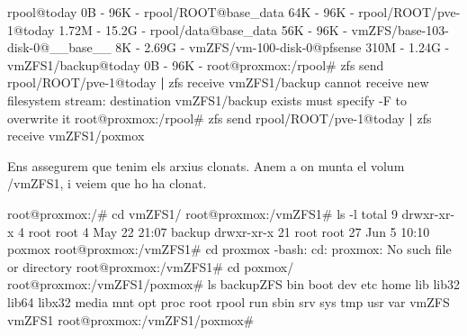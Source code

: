 \documentclass[
  10pt,
]{krantz}
\newenvironment{Shaded}{\begin{snugshade}}{\end{snugshade}}
\newcommand{\AttributeTok}[1]{\textcolor[rgb]{0.77,0.63,0.00}{#1}}
\newcommand{\ExtensionTok}[1]{#1}
\newcommand{\KeywordTok}[1]{\textcolor[rgb]{0.13,0.29,0.53}{\textbf{#1}}}
\newcommand{\NormalTok}[1]{#1}
\newcommand{\StringTok}[1]{\textcolor[rgb]{0.31,0.60,0.02}{#1}}
\begin{document}
\begin{Shaded}
\begin{Highlighting}[]
\ExtensionTok{rpool@today}\NormalTok{                        0B      }\AttributeTok{{-}}\NormalTok{       96K  }\AttributeTok{{-}}
\ExtensionTok{rpool/ROOT@base\_data}\NormalTok{              64K      }\AttributeTok{{-}}\NormalTok{       96K  }\AttributeTok{{-}}
\ExtensionTok{rpool/ROOT/pve{-}1@today}\NormalTok{          1.72M      }\AttributeTok{{-}}\NormalTok{     15.2G  }\AttributeTok{{-}}
\ExtensionTok{rpool/data@base\_data}\NormalTok{              56K      }\AttributeTok{{-}}\NormalTok{       96K  }\AttributeTok{{-}}
\ExtensionTok{vmZFS/base{-}103{-}disk{-}0@\_\_base\_\_}\NormalTok{     8K      }\AttributeTok{{-}}\NormalTok{     2.69G  }\AttributeTok{{-}}
\ExtensionTok{vmZFS/vm{-}100{-}disk{-}0@pfsense}\NormalTok{      310M      }\AttributeTok{{-}}\NormalTok{     1.24G  }\AttributeTok{{-}}
\ExtensionTok{vmZFS1/backup@today}\NormalTok{                0B      }\AttributeTok{{-}}\NormalTok{       96K  }\AttributeTok{{-}}
\ExtensionTok{root@proxmox:/rpool\#}\NormalTok{ zfs send rpool/ROOT/pve{-}1@today }\KeywordTok{|} \ExtensionTok{zfs}\NormalTok{ receive vmZFS1/backup}
\ExtensionTok{cannot}\NormalTok{ receive new filesystem stream: destination }\StringTok{\textquotesingle{}vmZFS1/backup\textquotesingle{}}\NormalTok{ exists}
\ExtensionTok{must}\NormalTok{ specify }\AttributeTok{{-}F}\NormalTok{ to overwrite it}
\ExtensionTok{root@proxmox:/rpool\#}\NormalTok{ zfs send rpool/ROOT/pve{-}1@today }\KeywordTok{|} \ExtensionTok{zfs}\NormalTok{ receive vmZFS1/poxmox}
\end{Highlighting}
\end{Shaded}

Ens assegurem que tenim els arxius clonats. Anem a on munta el volum /vmZFS1, i veiem que ho ha clonat.

\begin{Shaded}
\begin{Highlighting}[]
\ExtensionTok{root@proxmox:/\#}\NormalTok{ cd vmZFS1/}
\ExtensionTok{root@proxmox:/vmZFS1\#}\NormalTok{ ls }\AttributeTok{{-}l}
\ExtensionTok{total}\NormalTok{ 9}
\ExtensionTok{drwxr{-}xr{-}x}\NormalTok{  4 root root  4 May 22 21:07 backup}
\ExtensionTok{drwxr{-}xr{-}x}\NormalTok{ 21 root root 27 Jun  5 10:10 poxmox}
\ExtensionTok{root@proxmox:/vmZFS1\#}\NormalTok{ cd proxmox}
\ExtensionTok{{-}bash:}\NormalTok{ cd: proxmox: No such file or directory}
\ExtensionTok{root@proxmox:/vmZFS1\#}\NormalTok{ cd poxmox/}
\ExtensionTok{root@proxmox:/vmZFS1/poxmox\#}\NormalTok{ ls}
\ExtensionTok{backupZFS}\NormalTok{  bin  boot  dev  etc  home  lib  lib32}
\ExtensionTok{lib64}\NormalTok{  libx32  media  mnt  opt  proc  root  rpool}
\ExtensionTok{run}\NormalTok{  sbin  srv  sys  tmp  usr  var  vmZFS  vmZFS1}
\ExtensionTok{root@proxmox:/vmZFS1/poxmox\#} 
\end{Highlighting}
\end{Shaded}
\end{document}
